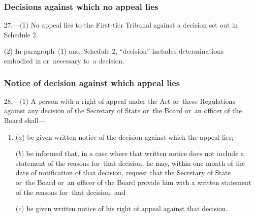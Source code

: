 \documentclass[12pt,a4paper]{article}
\begin{document}

\subsubsection[27. Decisions against which no appeal lies]{Decisions against which no appeal lies}

27.—(1) No appeal lies to 
the First-tier Tribunal  %
against a decision set out in Schedule 2.

(2) In paragraph~(1) and~Schedule 2, “decision” includes determinations embodied in or~necessary to~a decision.



\subsubsection[28. Notice of decision against which appeal lies]{Notice of decision against which appeal lies}

28.—(1) A person with a right of appeal under the Act or~these Regulations against any decision of the Secretary of State 
or~the Board or~an officer of the Board  %
shall—
\begin{enumerate}\item[]
($a$) be given written notice of the decision against which the appeal lies;

($b$) be informed that, in a case where that written notice does not include a statement of the reasons for~that decision, he may, within one month of the date of notification of that decision, request that the Secretary of State 
or~the Board or~an officer of the Board  %
provide him with a written statement of the reasons for~that decision; and

($c$) be given written notice of his right of appeal against that decision.
\end{enumerate}
\end{document}
